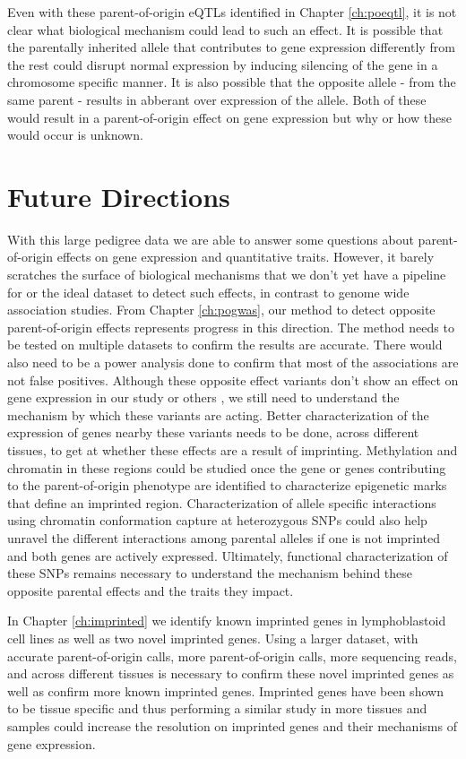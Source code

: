 Even with these parent-of-origin eQTLs identified in Chapter \ref{ch:poeqtl}, it is not clear what biological mechanism could lead to such an effect. It is possible that the parentally inherited allele that contributes to gene expression differently from the rest could disrupt normal expression by inducing silencing of the gene in a chromosome specific manner. It is also possible that the opposite allele - from the same parent - results in abberant over expression of the allele. Both of these would result in a parent-of-origin effect on gene expression but why or how these would occur is unknown. 

\section{Future Directions}

With this large pedigree data we are able to answer some questions about parent-of-origin effects on gene expression and quantitative traits. However, it barely scratches the surface of biological mechanisms that we don't yet have a pipeline for or the ideal dataset to detect such effects, in contrast to genome wide association studies. From Chapter \ref{ch:pogwas}, our method to detect opposite parent-of-origin effects represents progress in this direction. The method needs to be tested on multiple datasets to confirm the results are accurate. There would also need to be a power analysis done to confirm that most of the associations are not false positives. Although these opposite effect variants don't show an effect on gene expression in our study or others \cite{Benonisdottir:2016dz}, we still need to understand the mechanism by which these variants are acting. Better characterization of the expression of genes nearby these variants needs to be done, across different tissues, to get at whether these effects are a result of imprinting. Methylation and chromatin in these regions could be studied once the gene or genes contributing to the parent-of-origin phenotype are identified to characterize epigenetic marks that define an imprinted region. Characterization of allele specific interactions using chromatin conformation capture at heterozygous SNPs could also help unravel the different interactions among parental alleles if one is not imprinted and both genes are actively expressed. Ultimately, functional characterization of these SNPs remains necessary to understand the mechanism behind these opposite parental effects and the traits they impact.

In Chapter \ref{ch:imprinted} we identify known imprinted genes in lymphoblastoid cell lines as well as two novel imprinted genes. Using a larger dataset, with accurate parent-of-origin calls, more parent-of-origin calls, more sequencing reads, and across different tissues is necessary to confirm these novel imprinted genes as well as confirm more known imprinted genes. Imprinted genes have been shown to be tissue specific \cite{Baran:2015cx} and thus performing a similar study in more tissues and samples could increase the resolution on imprinted genes and their mechanisms of gene expression. 

